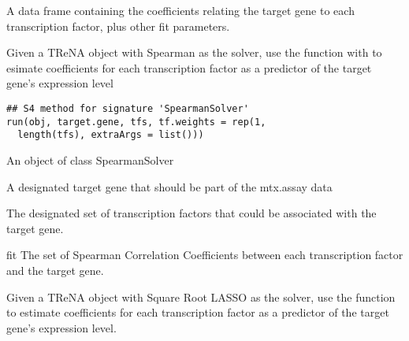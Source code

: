 \documentclass[a4paper]{book}
\begin{document}
%
\begin{Value}
A data frame containing the coefficients relating the target gene to each transcription factor, plus other fit parameters.
\end{Value}
%
\begin{SeeAlso}\relax
{}
\end{SeeAlso}
%
\begin{Description}\relax
Given a TReNA object with Spearman as the solver, use the  function with
 to esimate coefficients for each transcription factor as a predictor of the target
gene's expression level
\end{Description}
%
\begin{Usage}
\begin{verbatim}
## S4 method for signature 'SpearmanSolver'
run(obj, target.gene, tfs, tf.weights = rep(1,
  length(tfs), extraArgs = list()))
\end{verbatim}
\end{Usage}
%
\begin{Arguments}
\begin{ldescription}
\item[\code{obj}] An object of class SpearmanSolver

\item[\code{target.gene}] A designated target gene that should be part of the mtx.assay data

\item[\code{tfs}] The designated set of transcription factors that could be associated with the target gene.
\end{ldescription}
\end{Arguments}
%
\begin{Value}
fit The set of Spearman Correlation Coefficients between each transcription factor and the target gene.
\end{Value}
%
\begin{SeeAlso}\relax
{}
\end{SeeAlso}
%
\begin{Description}\relax
Given a TReNA object with Square Root LASSO as the solver, use the  function to estimate coefficients
for each transcription factor as a predictor of the target gene's expression level.
\end{Description}
\end{document}
